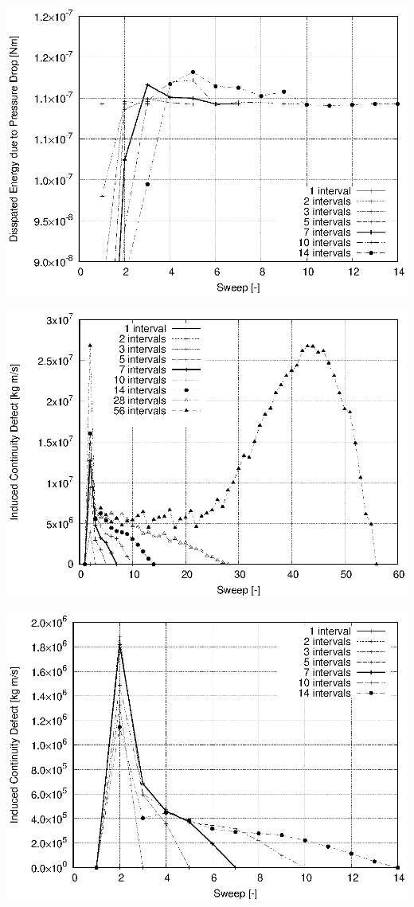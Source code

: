 \documentclass[twoside,a4paper,12pt,bibliography=totoc, parskip=half,english]{scrreprt}
\begin{document}
\includegraphics[scale=1]{12_primal_modef_newton_zoom.eps}

\includegraphics[scale=1]{14_primal_modef_newton.eps}

\includegraphics[scale=1]{14_primal_modef_newton_zoom.eps}
\end{document}
